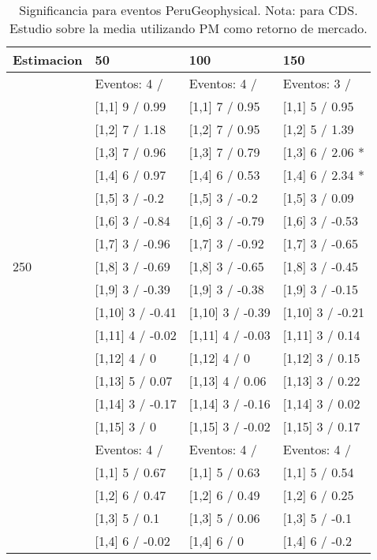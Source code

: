 \begin{table}

\caption{Significancia para eventos PeruGeophysical. Nota: para CDS. Estudio sobre la media utilizando PM como retorno de mercado.}
\centering
\begin{tabular}[t]{llll}
\toprule
Estimacion & 50 & 100 & 150\\
\midrule
 & Eventos:  4 / & Eventos:  4 / & Eventos:  3 /\\
 & {}[1,1] 9  / 0.99 & {}[1,1] 7  / 0.95 & {}[1,1] 5  / 0.95\\
 & {}[1,2] 7  / 1.18 & {}[1,2] 7  / 0.95 & {}[1,2] 5  / 1.39\\
 & {}[1,3] 7  / 0.96 & {}[1,3] 7  / 0.79 & {}[1,3] 6  / 2.06 *\\
 & {}[1,4] 6  / 0.97 & {}[1,4] 6  / 0.53 & {}[1,4] 6  / 2.34 *\\
\addlinespace
 & {}[1,5] 3  / -0.2 & {}[1,5] 3  / -0.2 & {}[1,5] 3  / 0.09\\
 & {}[1,6] 3  / -0.84 & {}[1,6] 3  / -0.79 & {}[1,6] 3  / -0.53\\
 & {}[1,7] 3  / -0.96 & {}[1,7] 3  / -0.92 & {}[1,7] 3  / -0.65\\
250 & {}[1,8] 3  / -0.69 & {}[1,8] 3  / -0.65 & {}[1,8] 3  / -0.45\\
 & {}[1,9] 3  / -0.39 & {}[1,9] 3  / -0.38 & {}[1,9] 3  / -0.15\\
\addlinespace
 & {}[1,10] 3  / -0.41 & {}[1,10] 3  / -0.39 & {}[1,10] 3  / -0.21\\
 & {}[1,11] 4  / -0.02 & {}[1,11] 4  / -0.03 & {}[1,11] 3  / 0.14\\
 & {}[1,12] 4  / 0 & {}[1,12] 4  / 0 & {}[1,12] 3  / 0.15\\
 & {}[1,13] 5  / 0.07 & {}[1,13] 4  / 0.06 & {}[1,13] 3  / 0.22\\
 & {}[1,14] 3  / -0.17 & {}[1,14] 3  / -0.16 & {}[1,14] 3  / 0.02\\
\addlinespace
 & {}[1,15] 3  / 0 & {}[1,15] 3  / -0.02 & {}[1,15] 3  / 0.17\\
 & Eventos:  4 / & Eventos:  4 / & Eventos:  4 /\\
 & {}[1,1] 5  / 0.67 & {}[1,1] 5  / 0.63 & {}[1,1] 5  / 0.54\\
 & {}[1,2] 6  / 0.47 & {}[1,2] 6  / 0.49 & {}[1,2] 6  / 0.25\\
 & {}[1,3] 5  / 0.1 & {}[1,3] 5  / 0.06 & {}[1,3] 5  / -0.1\\
\addlinespace
 & {}[1,4] 6  / -0.02 & {}[1,4] 6  / 0 & {}[1,4] 6  / -0.2\\

\end{tabular}
\end{table}
